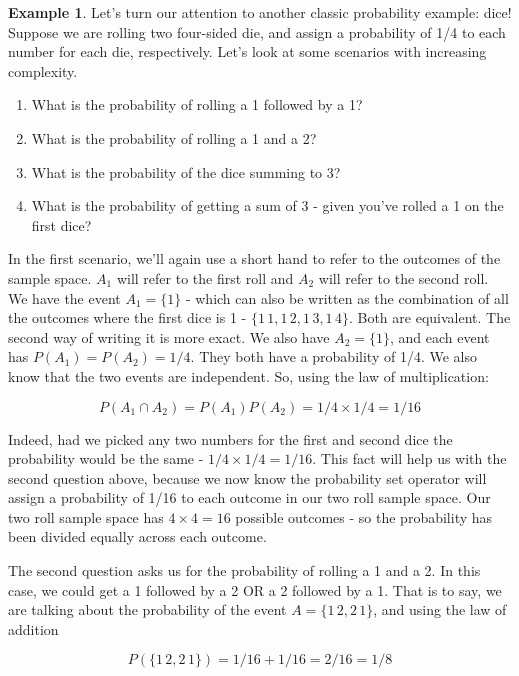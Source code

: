 \documentclass[
]{book}
\providecommand{\tightlist}{%
  \setlength{\itemsep}{0pt}\setlength{\parskip}{0pt}}
\theoremstyle{definition}
\theoremstyle{definition}
\newtheorem{example}{Example}[chapter]
\theoremstyle{definition}
\theoremstyle{definition}
\theoremstyle{remark}
\begin{document}
\begin{example}
\protect\hypertarget{exm:dice}{}\label{exm:dice}Let's turn our attention to another classic probability example: dice! Suppose we are rolling two four-sided die, and assign a probability of 1/4 to each number for each die, respectively. Let's look at some scenarios with increasing complexity.

\begin{enumerate}
\def\labelenumi{\arabic{enumi}.}
\tightlist
\item
  What is the probability of rolling a 1 followed by a 1?
\item
  What is the probability of rolling a 1 and a 2?
\item
  What is the probability of the dice summing to 3?
\item
  What is the probability of getting a sum of 3 - given you've rolled a 1 on the first dice?
\end{enumerate}

In the first scenario, we'll again use a short hand to refer to the outcomes of the sample space. \(A_1\) will refer to the first roll and \(A_2\) will refer to the second roll. We have the event \(A_1 = \{1\}\) - which can also be written as the combination of all the outcomes where the first dice is 1 - \(\{1\,1,1\,2,1\,3,1\,4\}\). Both are equivalent. The second way of writing it is more exact. We also have \(A_2 = \{1\}\), and each event has \(P(A_1) = P(A_2) = 1/4\). They both have a probability of 1/4. We also know that the two events are independent. So, using the law of multiplication:

\[P(A_1 \cap A_2) = P(A_1)P(A_2) = 1/4 \times 1/4 = 1/16\]

Indeed, had we picked any two numbers for the first and second dice the probability would be the same - \(1/4 \times 1/4 = 1/16\). This fact will help us with the second question above, because we now know the probability set operator will assign a probability of 1/16 to each outcome in our two roll sample space. Our two roll sample space has \(4 \times 4 = 16\) possible outcomes - so the probability has been divided equally across each outcome.

The second question asks us for the probability of rolling a 1 and a 2. In this case, we could get a 1 followed by a 2 OR a 2 followed by a 1. That is to say, we are talking about the probability of the event \(A = \{1\,2, 2\,1\}\), and using the law of addition

\[P(\{1\,2, 2\,1\}) = 1/16 + 1/16 = 2/16 = 1/8\]


\end{example}
\end{document}

